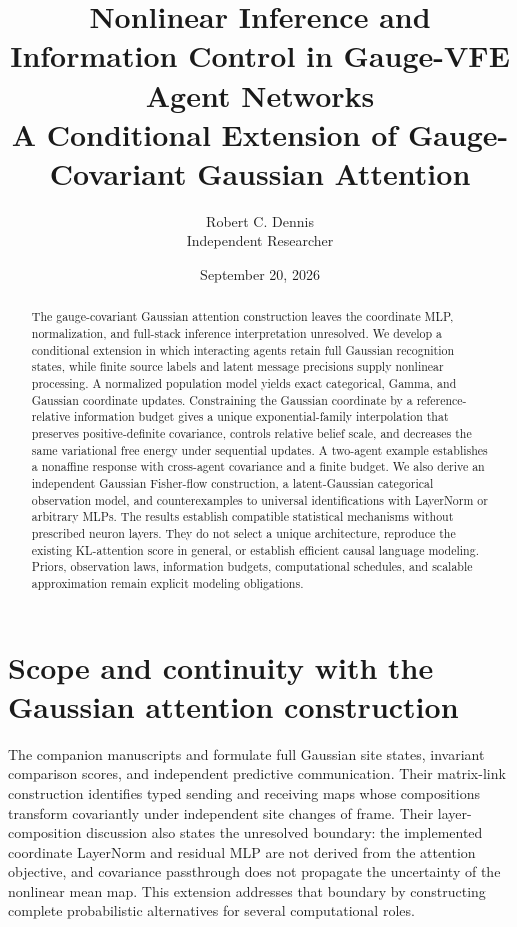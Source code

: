 \documentclass[11pt]{article}
\title{Nonlinear Inference and Information Control in Gauge-VFE Agent Networks\\[0.5em]\large A Conditional Extension of Gauge-Covariant Gaussian Attention}
\author{Robert C. Dennis\\Independent Researcher}
\date{September 20, 2026}
\begin{document}
\maketitle
\begin{abstract}
The gauge-covariant Gaussian attention construction leaves the coordinate MLP, normalization, and full-stack inference interpretation unresolved. We develop a conditional extension in which interacting agents retain full Gaussian recognition states, while finite source labels and latent message precisions supply nonlinear processing. A normalized population model yields exact categorical, Gamma, and Gaussian coordinate updates. Constraining the Gaussian coordinate by a reference-relative information budget gives a unique exponential-family interpolation that preserves positive-definite covariance, controls relative belief scale, and decreases the same variational free energy under sequential updates. A two-agent example establishes a nonaffine response with cross-agent covariance and a finite budget. We also derive an independent Gaussian Fisher-flow construction, a latent-Gaussian categorical observation model, and counterexamples to universal identifications with LayerNorm or arbitrary MLPs. The results establish compatible statistical mechanisms without prescribed neuron layers. They do not select a unique architecture, reproduce the existing KL-attention score in general, or establish efficient causal language modeling. Priors, observation laws, information budgets, computational schedules, and scalable approximation remain explicit modeling obligations.
\end{abstract}

\section{Scope and continuity with the Gaussian attention construction}
\label{sec:scope}

The companion manuscripts  and  formulate full Gaussian site states, invariant comparison scores, and independent predictive communication. Their matrix-link construction identifies typed sending and receiving maps whose compositions transform covariantly under independent site changes of frame. Their layer-composition discussion also states the unresolved boundary: the implemented coordinate LayerNorm and residual MLP are not derived from the attention objective, and covariance passthrough does not propagate the uncertainty of the nonlinear mean map. This extension addresses that boundary by constructing complete probabilistic alternatives for several computational roles.
\end{document}
